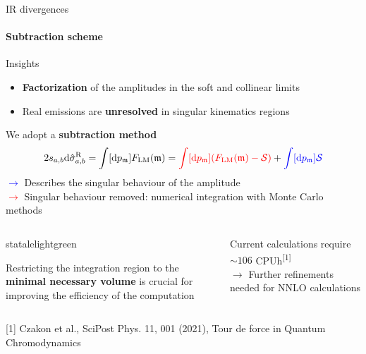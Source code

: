 
\begin{frame} {IR divergences}
 \framesubtitle{Subtraction scheme}
Insights \\
\begin{itemize}
    \item \textbf{Factorization} of the amplitudes in the soft and collinear limits 
    \item Real emissions are \textbf{unresolved} in singular kinematics regions
\end{itemize}
 \vspace{0.5em}
 We adopt a \textbf{subtraction method}
\begin{equation*}
    2s_{a,b} \mathrm{d} \hat{\sigma}_{a,b}^{\mathrm{R}} = \int [\mathrm{d}p_{\mathfrak{m}}] F_{\mathrm{LM}} (\mathfrak{m})=  \textcolor{red}{\int [\mathrm{d}p_{\mathfrak{m}}] (F_{\mathrm{LM}}(\mathfrak{m}) - \mathcal{S})}  + \textcolor{blue}{\int [\mathrm{d}p_{\mathfrak{m}}] \mathcal{S}}
    \label{subtraction-flm}
\end{equation*}
\textcolor{blue}{$\to$} Describes the singular behaviour of the amplitude\\ 
\textcolor{red}{$\to$} Singular behaviour removed: numerical integration with Monte Carlo methods \\


  \begin{columns}

    \begin{column}{0.50\textwidth}
 \begin{colorblock}[black]{statalelightgreen}{}
\begin{center}
    Restricting the integration region to the \\\textbf{minimal necessary volume} is crucial for improving the efficiency of the computation
\end{center}
\end{colorblock}
    \end{column}

    \begin{column}{0.50\textwidth}
    \begin{center}
        Current calculations require $\sim 106$ CPUh\textsuperscript{[1]} \\
        $\to$ Further refinements needed for NNLO calculations 
    \end{center}
    \end{column}
    \end{columns}

\vspace{0.3em}
    {\tiny
[1] Czakon et al., SciPost Phys. 11, 001 (2021), Tour de force in Quantum Chromodynamics
}





\end{frame}

